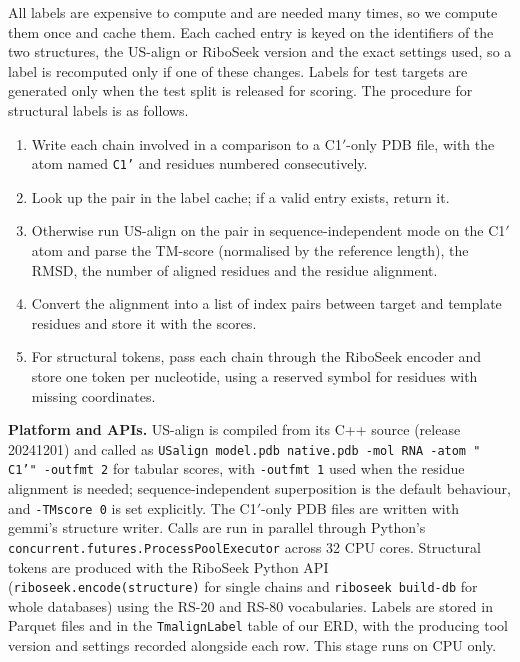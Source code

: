 \documentclass{FastFyp}
\begin{document}
All labels are expensive to compute and are needed many times, so we compute them once and cache them. Each cached entry is keyed on the identifiers of the two structures, the US-align or RiboSeek version and the exact settings used, so a label is recomputed only if one of these changes. Labels for test targets are generated only when the test split is released for scoring. The procedure for structural labels is as follows.

\begin{enumerate}
\item Write each chain involved in a comparison to a C1$'$-only PDB file, with the atom named \texttt{C1'} and residues numbered consecutively.
\item Look up the pair in the label cache; if a valid entry exists, return it.
\item Otherwise run US-align on the pair in sequence-independent mode on the C1$'$ atom and parse the TM-score (normalised by the reference length), the RMSD, the number of aligned residues and the residue alignment.
\item Convert the alignment into a list of index pairs between target and template residues and store it with the scores.
\item For structural tokens, pass each chain through the RiboSeek encoder and store one token per nucleotide, using a reserved symbol for residues with missing coordinates.
\end{enumerate}

\textbf{Platform and APIs.} US-align is compiled from its C++ source (release 20241201) and called as \texttt{USalign model.pdb native.pdb -mol RNA -atom " C1'" -outfmt 2} for tabular scores, with \texttt{-outfmt 1} used when the residue alignment is needed; sequence-independent superposition is the default behaviour, and \texttt{-TMscore 0} is set explicitly. The C1$'$-only PDB files are written with gemmi's structure writer. Calls are run in parallel through Python's \texttt{concurrent.futures.ProcessPoolExecutor} across 32 CPU cores. Structural tokens are produced with the RiboSeek Python API (\texttt{riboseek.encode(structure)} for single chains and \texttt{riboseek build-db} for whole databases) using the RS-20 and RS-80 vocabularies. Labels are stored in Parquet files and in the \texttt{TmalignLabel} table of our ERD, with the producing tool version and settings recorded alongside each row. This stage runs on CPU only.
\end{document}
